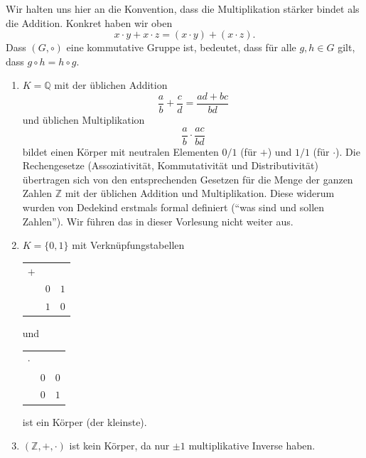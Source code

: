 \documentclass[../main.tex]{subfiles}
\begin{document}
Wir halten uns hier an die Konvention, dass die Multiplikation stärker
bindet als die Addition. Konkret haben wir oben
\[ x \cdot y + x \cdot z = (x \cdot y) + (x \cdot z).\]
Dass $(G, \circ)$ eine kommutative Gruppe ist, bedeutet,
dass für alle $g, h \in G$ gilt, dass $g \circ h = h \circ g$.

\begin{examples}
  \leavevmode
  \begin{enumerate}[(1)]
    \item $K = \mathbb Q$ mit der üblichen Addition
      \[ \frac{a}{b} + \frac{c}{d} = \frac{ad + bc}{bd}\]
      und üblichen Multiplikation
      \[ \frac{a}{b} \cdot \frac{ac}{bd}\]
      bildet einen Körper mit neutralen Elementen $0/1$ (für $+$) und $1/1$ (für $\cdot$).
      Die Rechengesetze (Assoziativität, Kommutativität und Distributivität) übertragen
      sich von den entsprechenden Gesetzen für die Menge der ganzen Zahlen $\mathbb Z$
      mit der üblichen Addition und Multiplikation.
      Diese widerum wurden von Dedekind erstmals formal definiert (``was
      sind und sollen Zahlen'').
      Wir
      führen das in dieser Vorlesung nicht weiter aus.
    \item $K = \{0, 1\}$ mit Verknüpfungstabellen
      \begin{table}[h]
        \centering
        \begin{tabular}[h]{ccc}
         $+$ & \color{gray}{$0$} & \color{gray}{ $1$ }\\
        \color{gray}{$0$} & $0$ & $1$ \\
        \color{gray}{$1$} & $1$ & $0$
        \end{tabular}
      \end{table}
      und
      \begin{table}[h]
        \centering
        \begin{tabular}[h]{ccc}
          $\cdot$ & \color{gray}{$0$} & \color{gray}{$1$} \\
          \color{gray}{$0$} & $0$ & $0$ \\
          \color{gray}{$1$} & $0$ & $1$
        \end{tabular}
      \end{table}
      ist ein Körper (der kleinste).
    \item $(\mathbb Z, + , \cdot)$ ist kein Körper, da nur $\pm 1$ multiplikative
      Inverse haben.
  \end{enumerate}
\end{examples}
\end{document}
